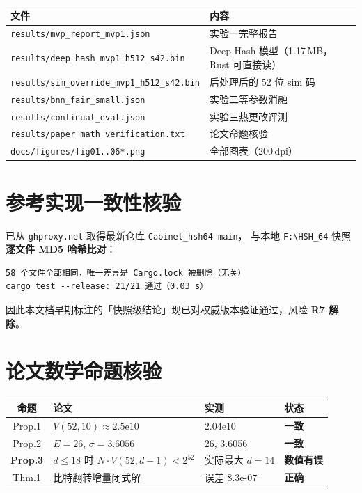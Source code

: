 \documentclass[11pt,a4paper]{ctexart}
\newcommand{\warn}[1]{\textcolor{warnred}{\textbf{#1}}}
\newcommand{\ok}[1]{\textcolor{okgreen}{\textbf{#1}}}
\begin{document}
\begin{center}
\begin{tabularx}{\textwidth}{@{}lX@{}}
\toprule
\textbf{文件} & \textbf{内容} \\
\midrule
\texttt{results/mvp\_report\_mvp1.json} & 实验一完整报告 \\
\texttt{results/deep\_hash\_mvp1\_h512\_s42.bin} & Deep Hash 模型（1.17\,MB，Rust 可直接读） \\
\texttt{results/sim\_override\_mvp1\_h512\_s42.bin} & 后处理后的 52 位 sim 码 \\
\texttt{results/bnn\_fair\_small.json} & 实验二等参数消融 \\
\texttt{results/continual\_eval.json} & 实验三热更改评测 \\
\texttt{results/paper\_math\_verification.txt} & 论文命题核验 \\
\texttt{docs/figures/fig01..06*.png} & 全部图表（200\,dpi） \\
\bottomrule
\end{tabularx}
\end{center}

\appendix

\section{参考实现一致性核验}

已从 \texttt{ghproxy.net} 取得最新仓库 \texttt{Cabinet\_hsh64-main}，
与本地 \texttt{F:\textbackslash HSH\_64} 快照\textbf{逐文件 MD5 哈希比对}：

\begin{verbatim}
58 个文件全部相同，唯一差异是 Cargo.lock 被删除（无关）
cargo test --release: 21/21 通过（0.03 s）
\end{verbatim}

因此本文档早期标注的「快照级结论」现已对权威版本验证通过，风险 \textbf{R7 解除}。

\section{论文数学命题核验}

\begin{center}
\begin{tabularx}{\textwidth}{@{}clXl@{}}
\toprule
\textbf{命题} & \textbf{论文} & \textbf{实测} & \textbf{状态} \\
\midrule
Prop.1 & $V(52,10)\approx2.5\text{e}10$ & $2.04\text{e}10$ & \ok{一致} \\
Prop.2 & $E{=}26$, $\sigma{=}3.6056$ & 26, 3.6056 & \ok{一致} \\
\textbf{Prop.3} & $d\le18$ 时 $N\cdot V(52,d{-}1)<2^{52}$ & 实际最大 \textbf{$d=14$} & \warn{数值有误} \\
Thm.1 & 比特翻转增量闭式解 & 误差 $8.3\text{e-}07$ & \ok{正确} \\
\bottomrule
\end{tabularx}
\end{center}
\end{document}

